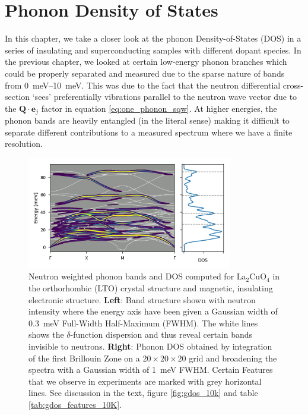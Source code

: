 \chapter{Phonon Density of States}\label{ch:in4}

In this chapter, we take a closer look at the phonon Density-of-States (DOS) in a series of insulating and superconducting samples with different dopant species. In the previous chapter, we looked at certain low-energy phonon branches which could be properly separated and measured due to the sparse nature of bands from \SIrange{0}{10}{\milli\eV}. This was due to the fact that the neutron differential cross-section `sees' preferentially vibrations parallel to the neutron wave vector due to the $\bm{Q} \cdot \bm{e}_j$ factor in equation \eqref{eq:one_phonon_sqw}. At higher energies, the phonon bands are heavily entangled (in the literal sense) making it difficult to separate different contributions to a measured spectrum where we have a finite resolution.

\begin{figure}
    \centering
    \includegraphics[width=0.8\textwidth]{fig/gdos/neutron_bands_dos_lto_afm.png}
    \caption{Neutron weighted phonon bands and DOS computed for La$_2$CuO$_4$ in the orthorhombic (LTO) crystal structure and magnetic, insulating electronic structure. \textbf{Left}: Band structure shown with neutron intensity where the energy axis have been given a Gaussian width of \SI{0.3}{\milli\eV} Full-Width Half-Maximum (FWHM). The white lines shows the $\delta$-function dispersion and thus reveal certain bands invisible to neutrons. \textbf{Right}: Phonon DOS obtained by integration of the first Brillouin Zone on a $20 \times 20 \times 20$ grid and broadening the spectra with a Gaussian width of \SI{1}{\milli\eV} FWHM. Certain Features that we observe in experiments are marked with grey horizontal lines. See discussion in the text, figure \ref{fig:gdos_10k} and table \ref{tab:gdos_features_10K}.}
    \label{fig:neutron_bands_dos_lto_afm}
\end{figure}

